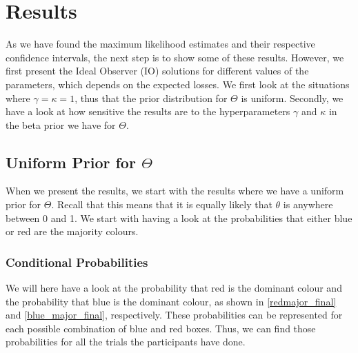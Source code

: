 \chapter{Results}

As we have found the maximum likelihood estimates and their respective confidence intervals, the next step is to show some of these results. However, we first present the Ideal Observer (IO) solutions for different values of the parameters, which depends on the expected losses. We first look at the situations where $\gamma=\kappa=1$, thus that the prior distribution for $\Theta$ is uniform. Secondly, we have a look at how sensitive the results are to the hyperparameters $\gamma$ and $\kappa$ in the beta prior we have for $\Theta$.

\section{Uniform Prior for $\Theta$}
When we present the results, we start with the results where we have a uniform prior for $\Theta$. Recall that this means that it is equally likely that $\theta$ is anywhere between 0 and 1. We start with having a look at the probabilities that either blue or red are the majority colours. 

\subsection{Conditional Probabilities}
We will here have a look at the probability that red is the dominant colour and the probability that blue is the dominant colour, as shown in \eqref{redmajor_final} and \eqref{blue_major_final}, respectively. These probabilities can be represented for each possible combination of blue and red boxes. Thus, we can find those probabilities for all the trials the participants have done. 

